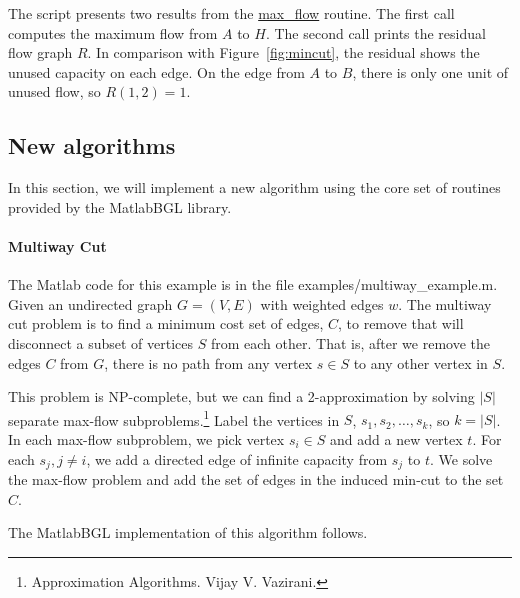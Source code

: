 \documentclass[12pt]{article}
\newcommand{\mycmd}[1]{\url{#1}}
\newcommand{\mypath}[1]{{\ttfamily \small #1}}
\begin{document}
The script presents two results from the \mycmd{max_flow} routine.  The first call computes the maximum flow from $A$ to $H$.  The second call prints the residual flow graph $R$.  In comparison with Figure~\ref{fig:mincut}, the residual shows the unused capacity on each edge. On the edge from $A$ to $B$, there is only one unit of unused flow, so $R(1,2) = 1$.  

\subsection{New algorithms}
In this section, we will implement a new algorithm using the core set of routines provided by the MatlabBGL library.

\paragraph{Multiway Cut}

The Matlab code for this example is in the file \mypath{examples/multiway\_example.m}.  
Given an undirected graph $G=(V,E)$ with weighted edges $w$.  The multiway cut problem is to find a minimum cost set of edges, $C$, to remove that will disconnect a subset of vertices $S$ from each other.  That is, after we remove the edges $C$ from $G$, there is no path from any vertex $s \in S$ to any other vertex in $S$.  

This problem is NP-complete, but we can find a 2-approximation by solving $|S|$ separate max-flow subproblems.\footnote{Approximation Algorithms.  Vijay V. Vazirani.}  Label the vertices in $S$, $s_1, s_2, \ldots, s_k$, so $k = |S|$.  In each max-flow subproblem, we pick vertex $s_i \in S$ and add a new vertex $t$.  For each $s_j, j\not=i$, we add a directed edge of infinite capacity from $s_j$ to $t$.  We solve the max-flow problem and add the set of edges in the induced min-cut to the set $C$.  

The MatlabBGL implementation of this algorithm follows.
\end{document}
